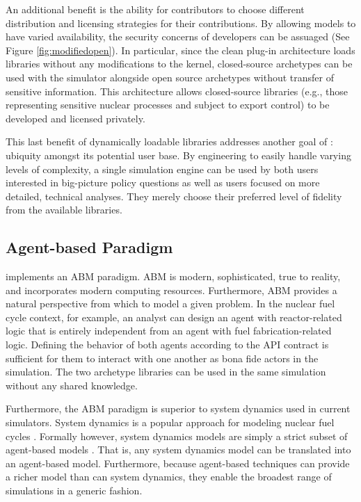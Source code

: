 An additional benefit is the ability for
contributors to choose different distribution and licensing strategies
for their contributions. By allowing models to have varied
availability, the security concerns of developers can be
assuaged (See Figure \ref{fig:modifiedopen}).
In particular, since the clean plug-in architecture loads libraries without any
modifications to the \Cyclus kernel, closed-source archetypes can be used with
the simulator alongside open source archetypes without transfer of sensitive information. This architecture
allows closed-source libraries (e.g., those representing sensitive nuclear
processes and subject to export control) to be developed and licensed privately.

This last benefit of dynamically loadable libraries addresses
another goal of \Cyclus: ubiquity amongst its potential user base. By
engineering \Cyclus to easily handle varying levels of complexity, a single
simulation engine can be used by both users interested in big-picture policy
questions as well as users focused on more detailed, technical
analyses. They merely choose their preferred level of fidelity from the 
available libraries. 

\subsection{Agent-based Paradigm}

\Cyclus implements an \acrlong{ABM} paradigm.  \gls{ABM} is modern, sophisticated, 
true to reality, and incorporates modern computing resources.
Furthermore, \gls{ABM} provides a natural 
perspective from which to model a given problem. In the nuclear fuel cycle 
context, for example, an analyst can design an agent with reactor-related logic 
that is entirely independent from an agent with fuel fabrication-related 
logic. Defining the behavior of both agents according to the 
\gls{API} contract is sufficient for them to interact with one another as 
bona fide actors in the simulation.  The two archetype libraries can be used in the same
simulation without any shared knowledge.

Furthermore, the \gls{ABM} paradigm is superior to system dynamics used in 
current simulators.
System dynamics is a popular approach for modeling nuclear fuel cycles 
\cite{jacobson_vision_2009,van_den_durpel_daness_2009,guerin_impact_2009,guerin_benchmark_2009}. 
Formally however, system dynamics models are simply a strict subset of agent-based models
\cite{macal_agent-based_2010}.
That is, any system dynamics model can be translated
into an agent-based model. Furthermore, because agent-based
techniques can provide a richer model than can system dynamics, they enable the 
broadest range of simulations in a generic fashion.

